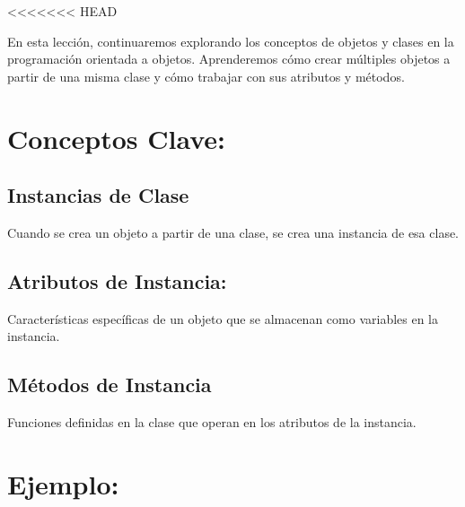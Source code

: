 \documentclass[
  a4paper,
  DIV=11,
  numbers=noendperiod,
  onepage,
  openany]{scrreprt}
\begin{document}
\textless\textless\textless\textless\textless\textless\textless{} HEAD

En esta lección, continuaremos explorando los conceptos de objetos y
clases en la programación orientada a objetos. Aprenderemos cómo crear
múltiples objetos a partir de una misma clase y cómo trabajar con sus
atributos y métodos.

\hypertarget{conceptos-clave-50}{%
\section{Conceptos Clave:}\label{conceptos-clave-50}}

\hypertarget{instancias-de-clase}{%
\subsection{Instancias de Clase}\label{instancias-de-clase}}

Cuando se crea un objeto a partir de una clase, se crea una instancia de
esa clase.

\hypertarget{atributos-de-instancia}{%
\subsection{Atributos de Instancia:}\label{atributos-de-instancia}}

Características específicas de un objeto que se almacenan como variables
en la instancia.

\hypertarget{muxe9todos-de-instancia}{%
\subsection{Métodos de Instancia}\label{muxe9todos-de-instancia}}

Funciones definidas en la clase que operan en los atributos de la
instancia.

\hypertarget{ejemplo-50}{%
\section{Ejemplo:}\label{ejemplo-50}}
\end{document}
